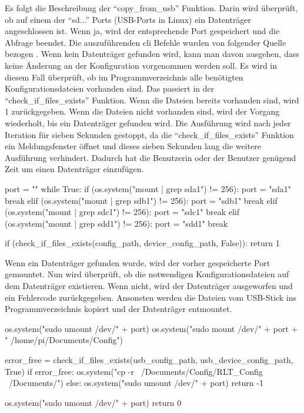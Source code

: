 Es folgt die Beschreibung der \enquote{copy\_from\_usb} Funktion. Darin wird überprüft, ob auf einem der \enquote{sd...} Ports (USB-Ports in Linux) ein Datenträger angeschlossen ist. Wenn ja, wird der entsprechende Port gespeichert und die Abfrage beendet. Die auszuführenden \acf{cli} Befehle wurden von folgender Quelle bezogen \cite[vgl.][]{Rendek:2023}. Wenn kein Datenträger gefunden wird, kann man davon ausgehen, dass keine Änderung an der Konfiguration vorgenommen werden soll. Es wird in diesem Fall überprüft, ob im Programmverzeichnis alle benötigten Konfigurationsdateien vorhanden sind. Das passiert in der \enquote{check\_if\_files\_exists} Funktion. Wenn die Dateien bereits vorhanden sind, wird 1 zurückgegeben. Wenn die Dateien nicht vorhanden sind, wird der Vorgang wiederholt, bis ein Datenträger gefunden wird. Die Ausführung wird nach jeder Iteration für sieben Sekunden gestoppt, da die \enquote{check\_if\_files\_exists} Funktion ein Meldungsfenster öffnet und dieses sieben Sekunden lang die weitere Ausführung verhindert. Dadurch hat die Benutzerin oder der Benutzer genügend Zeit um einen Datenträger einzufügen.

\begin{pythoncode}
	port = ""
	while True:
		if (os.system("mount | grep sda1") != 256):
			port = "sda1"
			break
		elif (os.system("mount | grep sdb1") != 256):
			port = "sdb1"
			break
		elif (os.system("mount | grep sdc1") != 256):
			port = "sdc1"
			break
		elif (os.system("mount | grep sdd1") != 256):
			port = "sdd1"
			break
		
		if (check_if_files_exists(config_path, device_config_path, False)):
			return 1
\end{pythoncode}

Wenn ein Datenträger gefunden wurde, wird der vorher gespeicherte Port gemountet. Nun wird überprüft, ob die notwendigen Konfigurationsdateien auf dem Datenträger existieren. Wenn nicht, wird der Datenträger ausgeworfen und ein Fehlercode zurückgegeben. Ansonsten werden die Dateien vom USB-Stick ins Programmverzeichnis kopiert und der Datenträger entmountet. 
\begin{pythoncode}
	os.system("sudo umount /dev/" + port)
	os.system("sudo mount /dev/" + port + " /home/pi/Documents/Config")
	
	error_free = check_if_files_exists(usb_config_path, usb_device_config_path, True)
	if error_free:
		os.system("cp -r ~/Documents/Config/RLT_Config ~/Documents/")
	else:
		os.system("sudo umount /dev/" + port)
		return -1
		
	os.system("sudo umount /dev/" + port)
	return 0
\end{pythoncode}

